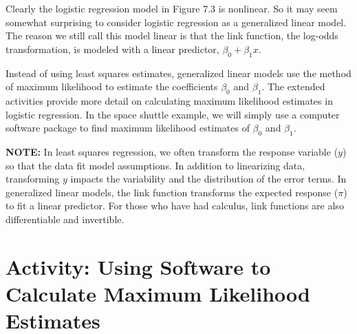 \documentclass[
]{report}
\begin{document}
Clearly the logistic regression model in Figure 7.3 is nonlinear. So it may seem somewhat surprising to consider logistic regression as a generalized linear model. The reason we still call this model linear is that the link function, the log-odds transformation, is modeled with a linear predictor, \(\beta_0 + \beta_1 x\).

Instead of using least squares estimates, generalized linear models use the method of maximum likelihood to estimate the coefficients \(\beta_0\) and \(\beta_1\). The extended activities provide more detail on calculating maximum likelihood estimates in logistic regression. In the space shuttle example, we will simply use a computer software package to find maximum likelihood estimates of \(\beta_0\) and \(\beta_1\).

\large

\textbf{NOTE:} In least squares regression, we often transform the response variable (\(y\)) so that the data fit model assumptions. In addition to linearizing data, transforming \(y\) impacts the variability and the distribution of the error terms. In generalized linear models, the link function transforms the expected response (\(\pi\)) to fit a linear predictor. For those who have had calculus, link functions are also differentiable and invertible.
\normalsize

\section*{Activity: Using Software to Calculate Maximum Likelihood Estimates}\label{activity-using-software-to-calculate-maximum-likelihood-estimates-1}
\end{document}
